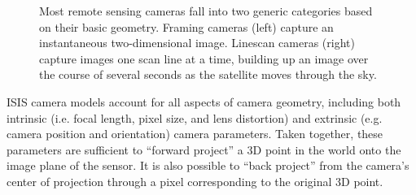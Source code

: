 \begin{figure}[h]
\centering
\caption{Most remote sensing cameras fall into two generic categories
  based on their basic geometry.  Framing cameras (left) capture an
  instantaneous two-dimensional image.  Linescan cameras (right)
  capture images one scan line at a time, building up an image over
  the course of several seconds as the satellite moves through the
  sky.}
\label{fig:camera_models}
\end{figure}

\ac{ISIS} camera models account for all aspects of camera geometry,
including both intrinsic (i.e. focal length, pixel size, and lens
distortion) and extrinsic (e.g. camera position and orientation)
camera parameters.  Taken together, these parameters are sufficient to
``forward project'' a 3D point in the world onto the image plane of
the sensor.  It is also possible to ``back project'' from the camera's
center of projection through a pixel corresponding to the original 3D
point.


